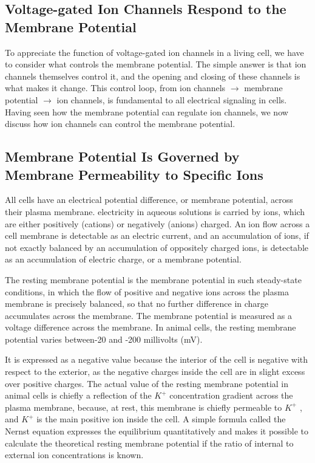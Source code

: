 \subsection{Voltage-gated Ion Channels Respond to the Membrane Potential}

To appreciate the function of voltage-gated ion channels in a living cell,
we have to consider what controls the membrane potential. The simple
answer is that ion channels themselves control it, and the opening and
closing of these channels is what makes it change. This control loop, from
ion channels $\rightarrow$ membrane potential $\rightarrow$ ion channels, is fundamental to
all electrical signaling in cells. Having seen how the membrane potential
can regulate ion channels, we now discuss how ion channels can control
the membrane potential.

\subsection{Membrane Potential Is Governed by Membrane Permeability to Specific Ions}

All cells have an electrical potential difference, or membrane potential,
across their plasma membrane. electricity in aqueous solutions is carried
by ions, which are either positively (cations) or negatively (anions)
charged. An ion flow across a cell membrane is detectable as an electric
current, and an accumulation of ions, if not exactly balanced by an accumulation
of oppositely charged ions, is detectable as an accumulation of
electric charge, or a membrane potential.

The resting membrane potential is the membrane potential in such steady-state
conditions, in which the flow of positive and negative ions across
the plasma membrane is precisely balanced, so that no further difference
in charge accumulates across the membrane. The membrane potential is
measured as a voltage difference across the membrane. In animal cells,
the resting membrane potential varies between-20 and -200 millivolts
(mV).

It is expressed as a negative value because the interior of the cell is negative with respect to the
exterior, as the negative charges inside the cell are in slight excess over
positive charges. The actual value of the resting membrane potential in
animal cells is chiefly a reflection of the $K^{+}$ concentration gradient across
the plasma membrane, because, at rest, this membrane is chiefly permeable
to $K^{+}$ , and $K^{+}$ is the main positive ion inside the cell. A simple
formula called the Nernst equation expresses the equilibrium quantitatively
and makes it possible to calculate the theoretical
resting membrane potential if the ratio of internal to external ion concentrations is known.

